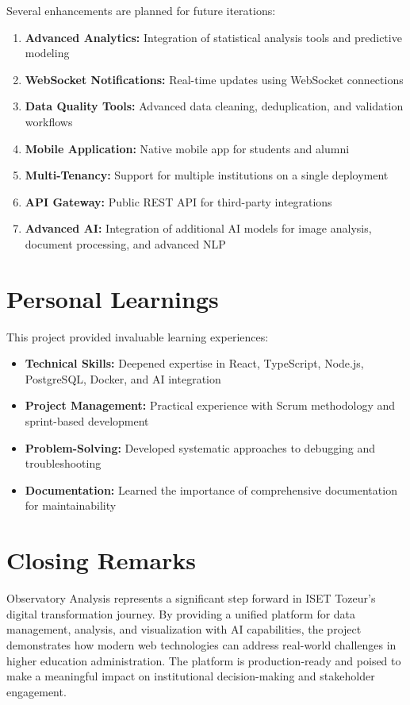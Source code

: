 \documentclass[12pt,a4paper]{report}
\begin{document}
Several enhancements are planned for future iterations:
\begin{enumerate}
    \item \textbf{Advanced Analytics:} Integration of statistical analysis tools and predictive modeling
    \item \textbf{WebSocket Notifications:} Real-time updates using WebSocket connections
    \item \textbf{Data Quality Tools:} Advanced data cleaning, deduplication, and validation workflows
    \item \textbf{Mobile Application:} Native mobile app for students and alumni
    \item \textbf{Multi-Tenancy:} Support for multiple institutions on a single deployment
    \item \textbf{API Gateway:} Public REST API for third-party integrations
    \item \textbf{Advanced AI:} Integration of additional AI models for image analysis, document processing, and advanced NLP
\end{enumerate}

\section*{Personal Learnings}

This project provided invaluable learning experiences:
\begin{itemize}
    \item \textbf{Technical Skills:} Deepened expertise in React, TypeScript, Node.js, PostgreSQL, Docker, and AI integration
    \item \textbf{Project Management:} Practical experience with Scrum methodology and sprint-based development
    \item \textbf{Problem-Solving:} Developed systematic approaches to debugging and troubleshooting
    \item \textbf{Documentation:} Learned the importance of comprehensive documentation for maintainability
\end{itemize}

\section*{Closing Remarks}

Observatory Analysis represents a significant step forward in ISET Tozeur's digital transformation journey. By providing a unified platform for data management, analysis, and visualization with AI capabilities, the project demonstrates how modern web technologies can address real-world challenges in higher education administration. The platform is production-ready and poised to make a meaningful impact on institutional decision-making and stakeholder engagement.
\end{document}
